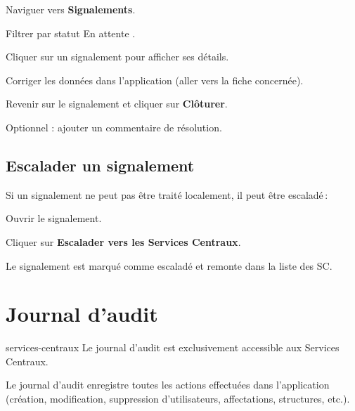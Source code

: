 \begin{steps}
  \item Naviguer vers \textbf{Signalements}.
  \item Filtrer par statut \og En attente \fg{}.
  \item Cliquer sur un signalement pour afficher ses d\'etails.
  \item Corriger les donn\'ees dans l'application (aller vers la fiche concern\'ee).
  \item Revenir sur le signalement et cliquer sur \textbf{Cl\^oturer}.
  \item Optionnel : ajouter un commentaire de r\'esolution.
\end{steps}

\subsection{Escalader un signalement}

Si un signalement ne peut pas \^etre trait\'e localement, il peut \^etre escalad\'e\,:

\begin{steps}
  \item Ouvrir le signalement.
  \item Cliquer sur \textbf{Escalader vers les Services Centraux}.
  \item Le signalement est marqu\'e comme escalad\'e et remonte dans la liste des SC.
\end{steps}

\section{Journal d'audit}

\begin{rolebox}{services-centraux}
  Le journal d'audit est exclusivement accessible aux Services Centraux.
\end{rolebox}

Le journal d'audit enregistre toutes les actions effectu\'ees dans l'application (cr\'eation, modification, suppression d'utilisateurs, affectations, structures, etc.).


